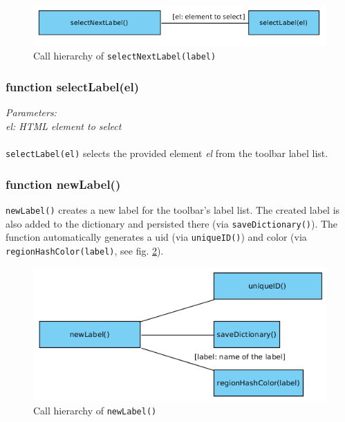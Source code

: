 \begin{figure}[H]
	\begin{center}
		\includegraphics[scale=0.5]{img/ch_selectNext.png}
		\caption{Call hierarchy of \texttt{selectNextLabel(label)}}
		\label{figB_selectNextl}
	\end{center}
\end{figure}


\subsubsection{function selectLabel(el)}
\emph{Parameters:\\
	el: HTML element to select\\ \\
}
\texttt{selectLabel(el)} selects the provided element \emph{el} from the toolbar label list.


\subsubsection{function newLabel()}
\texttt{newLabel()} creates a new label for the toolbar's label list. The created label is also added to the dictionary and persisted there (via \texttt{saveDictionary()}). The function automatically generates a uid (via \texttt{uniqueID()}) and color (via \texttt{regionHashColor(label)}, see fig. \ref{figB_newLabel}).

\begin{figure}[H]
	\begin{center}
		\includegraphics[scale=0.5]{img/ch_newLabel.png}
		\caption{Call hierarchy of \texttt{newLabel()}}
		\label{figB_newLabel}
	\end{center}
\end{figure}


